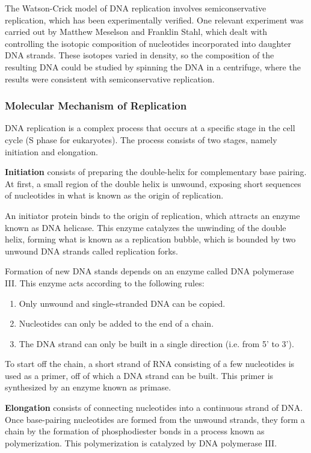 \documentclass[12pt,titlepage]{article}
\begin{document}
        The Watson-Crick model of DNA replication involves semiconservative replication, which has been experimentally verified. One relevant experiment was carried
        out by Matthew Meselson and Franklin Stahl, which dealt with controlling the isotopic composition of nucleotides incorporated into daughter DNA strands. These
        isotopes varied in density, so the composition of the resulting DNA could be studied by spinning the DNA in a centrifuge, where the results were consistent with
        semiconservative replication.

      \subsubsection{Molecular Mechanism of Replication}
        DNA replication is a complex process that occurs at a specific stage in the cell cycle (S phase for eukaryotes). The process consists of two stages, namely
        initiation and elongation.

        \textbf{Initiation} consists of preparing the double-helix for complementary base pairing. At first, a small region of the double helix is unwound, exposing
        short sequences of nucleotides in what is known as the origin of replication.

        An initiator protein binds to the origin of replication, which attracts an enzyme known as DNA helicase. This enzyme catalyzes the unwinding of the double
        helix, forming what is known as a replication bubble, which is bounded by two unwound DNA strands called replication forks.

        Formation of new DNA stands depends on an enzyme called DNA polymerase III. This enzyme acts according to the following rules:
        \begin{enumerate}
          \item Only unwound and single-stranded DNA can be copied.
          \item Nucleotides can only be added to the end of a chain.
          \item The DNA strand can only be built in a single direction (i.e. from 5' to 3').
        \end{enumerate}
        To start off the chain, a short strand of RNA consisting of a few nucleotides is used as a primer, off of which a DNA strand can be built. This primer is
        synthesized by an enzyme known as primase.

        \textbf{Elongation} consists of connecting nucleotides into a continuous strand of DNA. Once base-pairing nucleotides are formed from the unwound strands,
        they form a chain by the formation of phosphodiester bonds in a process known as polymerization. This polymerization is catalyzed by DNA polymerase III.
\end{document}
